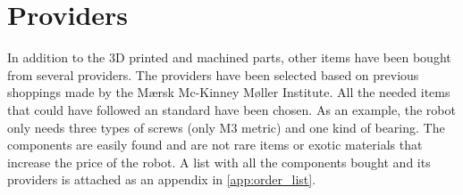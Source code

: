 \section{Providers} %
\label{sec:providers}
In addition to the 3D printed and machined parts, other items have been bought from several providers.
The providers have been selected based on previous shoppings made by the Mærsk Mc-Kinney Møller Institute.
All the needed items that could have followed an standard have been chosen. 
As an example, the robot only needs three types of screws (only M3 metric) and one kind of bearing.
The components are easily found and are not rare items or exotic materials that increase the price of the robot.
A list with all the components bought and its providers is attached as an appendix in \ref{app:order_list}.
